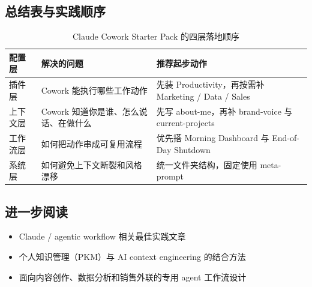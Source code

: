 \documentclass[a4paper]{article}
\begin{document}
\subsection{总结表与实践顺序}

\begin{table}[H]
\centering
\begin{tabular}{p{} p{} p{}}
\toprule
配置层 & 解决的问题 & 推荐起步动作 \\
\midrule
插件层 & Cowork 能执行哪些工作动作 & 先装 Productivity，再按需补 Marketing / Data / Sales \\
上下文层 & Cowork 知道你是谁、怎么说话、在做什么 & 先写 about-me，再补 brand-voice 与 current-projects \\
工作流层 & 如何把动作串成可复用流程 & 优先搭 Morning Dashboard 与 End-of-Day Shutdown \\
系统层 & 如何避免上下文断裂和风格漂移 & 统一文件夹结构，固定使用 meta-prompt \\
\bottomrule
\end{tabular}
\caption{Claude Cowork Starter Pack 的四层落地顺序}
\end{table}

\subsection{进一步阅读}

\begin{itemize}
    \item Claude / agentic workflow 相关最佳实践文章
    \item 个人知识管理（PKM）与 AI context engineering 的结合方法
    \item 面向内容创作、数据分析和销售外联的专用 agent 工作流设计
\end{itemize}

\end{document}

